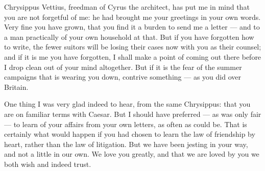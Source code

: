 

 Chrysippus Vettius, freedman of Cyrus the architect, has put me in mind that you are not forgetful of me: he had brought me your greetings in your own words. Very fine you have grown, that you find it a burden to send me a letter --- and to a man practically of your own household at that. But if you have forgotten how to write, the fewer suitors will be losing their cases now with you as their counsel; and if it is me you have forgotten, I shall make a point of coming out there before I drop clean out of your mind altogether. But if it is the fear of the summer campaigns that is wearing you down, contrive something --- as you did over Britain.

 One thing I was very glad indeed to hear, from the same Chrysippus: that you are on familiar terms with Caesar. But I should have preferred --- as was only fair --- to learn of your affairs from your own letters, as often as could be. That is certainly what would happen if you had chosen to learn the law of friendship by heart, rather than the law of litigation. But we have been jesting in your way, and not a little in our own. We love you greatly, and that we are loved by you we both wish and indeed trust.
